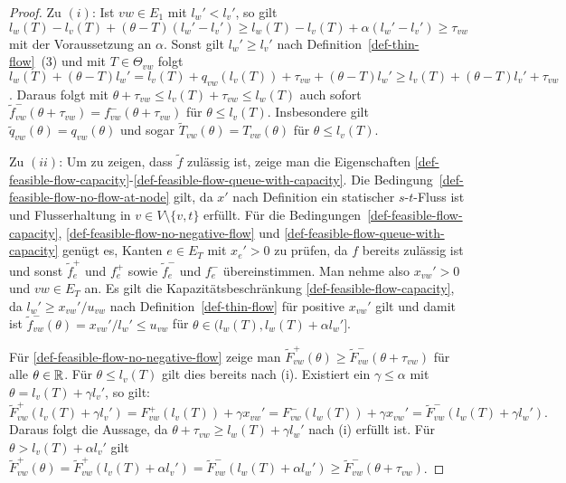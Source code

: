\begin{proof}
	Zu $(i)$: Ist $vw\in E_1$ mit $l_w'<l_v'$, so gilt
	$l_w(T)-l_v(T) + (\theta - T)(l_w' - l_v') \geq l_w(T)-l_v(T)+\alpha(l_w'- l_v')\geq \tau_{vw}$  mit der Voraussetzung an $\alpha$.
	Sonst gilt $l_w' \geq l_v'$ nach Definition~\ref{def-thin-flow}~(3) und mit $T\in \Theta_{vw}$ folgt $l_w(T)+(\theta-T)l_w'=l_v(T) + q_{vw}(l_v(T))+\tau_{vw}+(\theta - T)l_w' \geq l_v(T) + (\theta-T)l_v'+\tau_{vw}$.
	Daraus folgt mit $\theta + \tau_{vw} \leq l_v(T) + \tau_{vw} \leq l_w(T)$ auch sofort $\tilde{f}_{vw}^-(\theta + \tau_{vw}) = f_{vw}^-(\theta + \tau_{vw})$ für $\theta\leq l_v(T)$.
	Insbesondere gilt $\tilde{q}_{vw}(\theta) = q_{vw}(\theta)$ und sogar $ \tilde{T}_{vw}(\theta)= T_{vw}(\theta)$ für $\theta \leq l_v(T)$.
	
	Zu $(ii)$: Um zu zeigen, dass $\tilde{f}$ zulässig ist, zeige man die Eigenschaften \ref{def-feasible-flow-capacity}-\ref{def-feasible-flow-queue-with-capacity}.
	Die Bedingung~\ref{def-feasible-flow-no-flow-at-node} gilt, da $x'$ nach Definition ein statischer $s$-$t$-Fluss ist und Flusserhaltung in $v\in V\setminus \{ v, t \}$ erfüllt.
	Für die Bedingungen~\ref{def-feasible-flow-capacity}, \ref{def-feasible-flow-no-negative-flow} und \ref{def-feasible-flow-queue-with-capacity} genügt es, Kanten $e\in E_T$ mit $x_e' > 0$ zu prüfen, da $f$ bereits zulässig ist und sonst $\tilde{f}_{e}^+$ und  $f_{e}^+$ sowie $\tilde{f}_{e}^-$ und $f_{e}^-$ übereinstimmen.
	Man nehme also $x_{vw}' > 0$ und $vw\in E_T$ an.
	Es gilt die Kapazitätsbeschränkung \ref{def-feasible-flow-capacity}, da $l_w'\geq x_{vw}' / u_{vw}$ nach Definition~\ref{def-thin-flow} für positive $x_{vw}'$ gilt und damit ist $\tilde{f}^-_{vw}(\theta)=x_{vw}'/l_w'\leq u_{vw}$ für $\theta\in(l_w(T), l_w(T)+\alpha l_w']$.
	
	Für \ref{def-feasible-flow-no-negative-flow} zeige man $\tilde{F}^+_{vw}(\theta)\geq \tilde{F}_{vw}^-(\theta+\tau_{vw})$ für alle $\theta\in\mathbb{R}$.
	Für $\theta\leq l_v(T)$ gilt dies bereits nach (i).
	Existiert ein $\gamma\leq\alpha$ mit $\theta=l_v(T) + \gamma l_v'$, so gilt:
	\begin{equation}\label{eq-extension-nash-flow}
	\tilde{F}_{vw}^+(l_v(T) + \gamma l_v')=F_{vw}^+(l_v(T))+\gamma x_{vw}' = F_{vw}^-(l_w(T))+ \gamma x_{vw}'= \tilde{F}_{vw}^-(l_w(T)+\gamma l_w').
	\end{equation}
	Daraus folgt die Aussage, da $\theta + \tau_{vw}\geq l_w(T) + \gamma l_w'$ nach (i) erfüllt ist.
	Für $\theta > l_v(T)+\alpha l_v'$ gilt $\tilde{F}_{vw}^+(\theta) = \tilde{F}_{vw}^+(l_v(T) + \alpha l_v') = \tilde{F}_{vw}^-(l_w(T) + \alpha l_w') \geq \tilde{F}_{vw}^-(\theta + \tau_{vw})$.
	

\end{proof}
